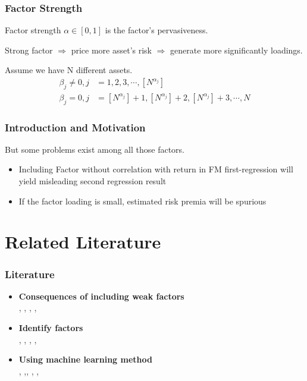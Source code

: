 \documentclass[12pt]{beamer}
\begin{document}
\begin{frame}
	\frametitle{Factor Strength}
	Factor strength $\alpha \in [0,1]$ is the factor's pervasiveness.\cite{Pesaran2019}
	
	
	
	Strong factor $\Rightarrow$ price more asset's risk $\Rightarrow$ generate more significantly loadings.

	 Assume we have N different assets.
	\begin{align*}
	\beta_j \neq 0, j &= 1, 2, 3, \cdots, [N^{\alpha_j}]\\
	\beta_j = 0, j &= [N^{\alpha_j} ]+1 ,[N^{\alpha_j}]  +2, [N^{\alpha_j}] +3, \cdots, N
	\end{align*}
\end{frame}
\begin{frame}
\frametitle{Introduction and Motivation}
But some problems exist among all those factors.\\


\begin{itemize}
\item Including Factor without correlation with return in FM first-regression\cite{Fama1973} will yield misleading second regression result \cite{Kan1999}
\item If the factor loading is small, estimated risk premia will be spurious 
\end{itemize}

\end{frame}


	\section{Related Literature}
	\begin{frame}
\frametitle{Literature}
\begin{itemize}
	\item{\bf Consequences of including weak factors}\\
	, , , , 
	\item {\bf Identify factors}\\
	, , , ,
	\item {\bf Using machine learning method}\\
	, ,, , , 
	\end{itemize}
	\end{frame}
	
\end{document}
